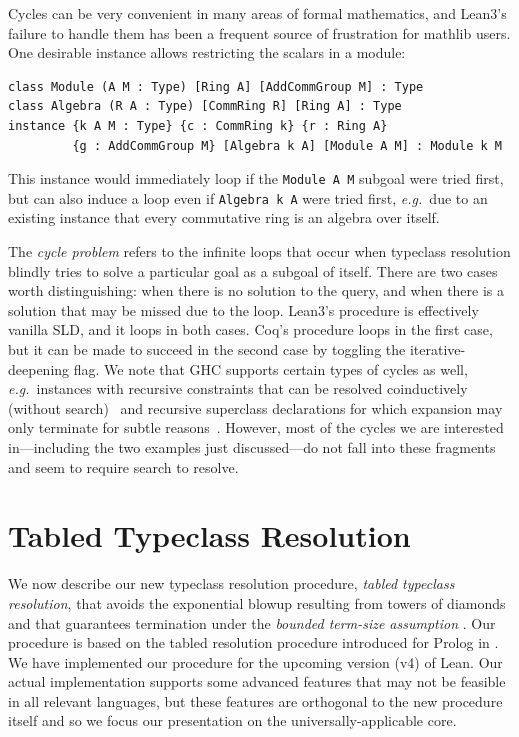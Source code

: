 \documentclass[runningheads]{llncs}
\newcommand\eg{\emph{e.g.}\ }
\begin{document}
Cycles can be very convenient in many areas of formal mathematics, and Lean3's failure to handle them has
been a frequent source of frustration for \textsf{mathlib} users. One desirable instance allows restricting the scalars in a module:
\begin{lstlisting}
class Module (A M : Type) [Ring A] [AddCommGroup M] : Type
class Algebra (R A : Type) [CommRing R] [Ring A] : Type
instance {k A M : Type} {c : CommRing k} {r : Ring A}
         {g : AddCommGroup M} [Algebra k A] [Module A M] : Module k M
\end{lstlisting}
This instance would immediately loop if the \lstinline{Module A M} subgoal were tried first,
but can also induce a loop even if \lstinline{Algebra k A} were tried first,
\eg due to an existing instance that every commutative ring is an algebra over itself.

The \emph{cycle problem} refers to the infinite loops that occur when typeclass resolution blindly tries to solve
a particular goal as a subgoal of itself. There are two cases worth distinguishing: when there is no solution to the query,
and when there is a solution that may be missed due to the loop.
Lean3's procedure is effectively vanilla SLD, and it loops in both cases.
Coq's procedure loops in the first case, but it can be made to succeed in the second case by toggling the iterative-deepening flag.
We note that GHC supports certain types of cycles as well,
\eg instances with recursive constraints that can be resolved coinductively (without search)~\cite{lammel2005scrap}
and recursive superclass declarations for which expansion may only terminate for subtle reasons~\cite{recursivesuperclasses}.
However, most of the cycles we are interested in---including the two examples just discussed---do not fall into these fragments
and seem to require search to resolve.

\section{Tabled Typeclass Resolution}\label{sec:ttr}

We now describe our new typeclass resolution procedure, \emph{tabled typeclass resolution},
that avoids the exponential blowup resulting from towers of diamonds and that
guarantees termination under the \emph{bounded term-size assumption} \cite{van1991well}.
Our procedure is based on the tabled resolution procedure introduced for Prolog in \cite{sagonas1998abstract}.
We have implemented our procedure for the upcoming version (v4) of Lean.
Our actual implementation supports some advanced features that may not be feasible in all relevant languages,
but these features are orthogonal to the new procedure itself and so we focus our presentation on the universally-applicable core.
\end{document}
